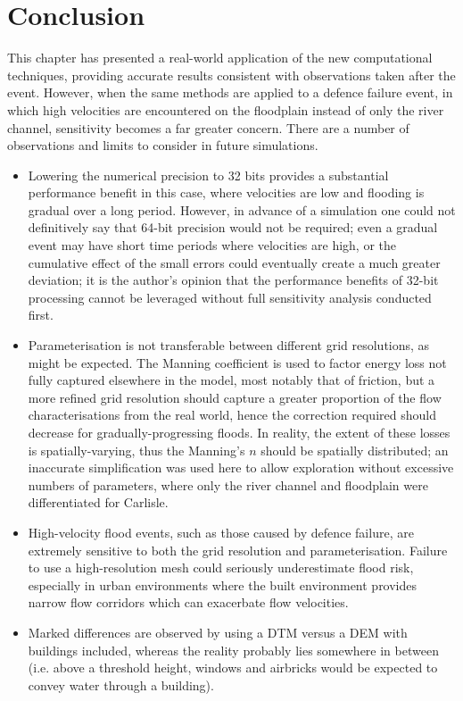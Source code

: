 \section{Conclusion}

This chapter has presented a real-world application of the new computational techniques, providing accurate results consistent with observations taken after the event. However, when the same methods are applied to a defence failure event, in which high velocities are encountered on the floodplain instead of only the river channel, sensitivity becomes a far greater concern. There are a number of observations and limits to consider in future simulations.

\begin{itemize}
	\item Lowering the numerical precision to 32 bits provides a substantial performance benefit in this case, where velocities are low and flooding is gradual over a long period. However, in advance of a simulation one could not definitively say that 64-bit precision would not be required; even a gradual event may have short time periods where velocities are high, or the cumulative effect of the small errors could eventually create a much greater deviation; it is the author's opinion that the performance benefits of 32-bit processing cannot be leveraged without full sensitivity analysis conducted first.
	\item Parameterisation is not transferable between different grid resolutions, as might be expected. The Manning coefficient is used to factor energy loss not fully captured elsewhere in the model, most notably that of friction, but a more refined grid resolution should capture a greater proportion of the flow characterisations from the real world, hence the correction required should decrease for gradually-progressing floods. In reality, the extent of these losses is spatially-varying, thus the Manning's $n$ should be spatially distributed; an inaccurate simplification was used here to allow exploration without excessive numbers of parameters, where only the river channel and floodplain were differentiated for Carlisle.
	\item High-velocity flood events, such as those caused by defence failure, are extremely sensitive to both the grid resolution and parameterisation. Failure to use a high-resolution mesh could seriously underestimate flood risk, especially in urban environments where the built environment provides narrow flow corridors which can exacerbate flow velocities.
	\item Marked differences are observed by using a DTM versus a DEM with buildings included, whereas the reality probably lies somewhere in between (i.e. above a threshold height, windows and airbricks would be expected to convey water through a building).

\end{itemize}
